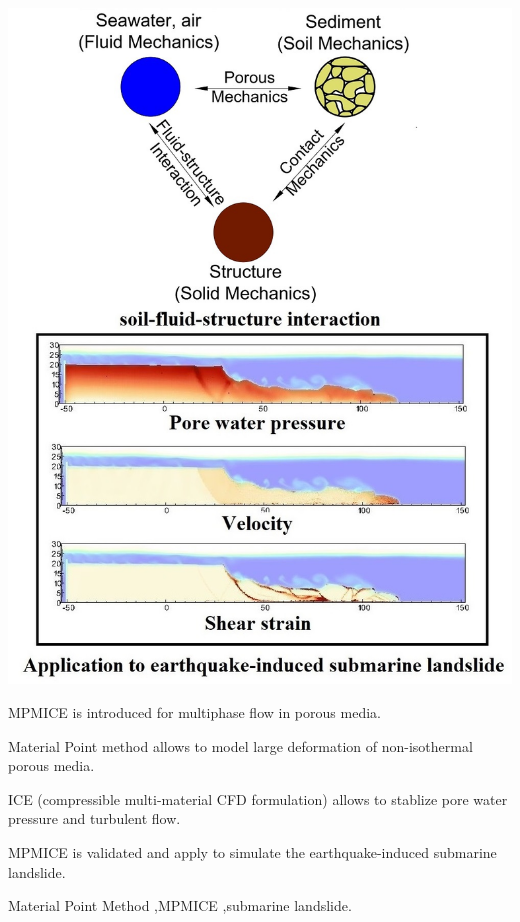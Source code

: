 \documentclass[preprint,12pt]{elsarticle}
\begin{document}
\begin{frontmatter}
\begin{graphicalabstract}
%
%
\center
\includegraphics[scale=0.45]{abstract.jpg}
%
%
\end{graphicalabstract}

\begin{highlights}
\item MPMICE is introduced for multiphase flow in porous media.
\item Material Point method allows to model large deformation of non-isothermal porous media.
\item ICE (compressible multi-material CFD formulation) allows to stablize pore water pressure and turbulent flow.
\item MPMICE is validated and apply to simulate the earthquake-induced submarine landslide.
\end{highlights}

\begin{keyword}


Material Point Method 
\sep MPMICE
\sep submarine landslide.
\end{keyword}

\end{frontmatter}
\end{document}
